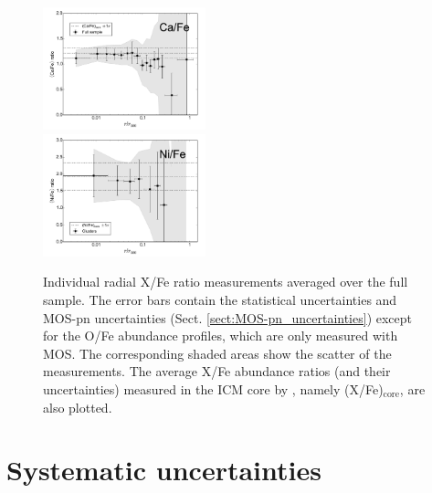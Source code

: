 \documentclass{aa}
\begin{document}
\begin{figure}[!]
                \includegraphics[width=0.42\textwidth]{fig_radial_stacked_Ca_normFe.pdf}
\\
                \includegraphics[width=0.42\textwidth]{fig_radial_stacked_Ni_normFe.pdf}


        \caption{Individual radial X/Fe ratio measurements averaged over the full sample. The error bars contain the statistical uncertainties and MOS-pn uncertainties (Sect. \ref{sect:MOS-pn_uncertainties}) except for the O/Fe abundance profiles, which are only measured with MOS. The corresponding shaded areas show the scatter of the measurements. The average X/Fe abundance ratios (and their uncertainties) measured in the ICM core by \citet{2016A&A...592A.157M}, namely (X/Fe)$_\text{core}$, are also plotted.}
\label{fig:abundance_profiles_normFe}
\end{figure}

























\section{Systematic uncertainties}\label{sect:systematics}

\end{document}
